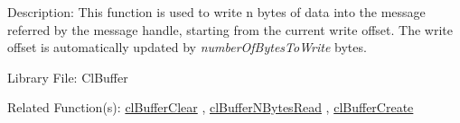\begin{Desc}
\item[Description:]This function is used to write n bytes of data into the message referred by the message handle, starting from the current write offset.
The write offset is automatically updated by {\em number\-Of\-Bytes\-To\-Write\/} bytes.\end{Desc}
\begin{Desc}
\item[Library File:]Cl\-Buffer\end{Desc}
\begin{Desc}
\item[Related Function(s):]\hyperlink{pagebuf106}{cl\-Buffer\-Clear} , \hyperlink{pagebuf108}{cl\-Buffer\-NBytes\-Read} , 
\hyperlink{pagebuf103}{cl\-Buffer\-Create} \end{Desc}


\newpage
